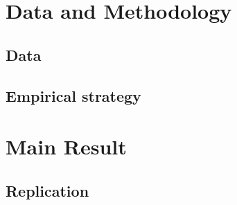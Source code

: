 \documentclass[12pt,a4paper]{article}
\newif\ifshowinstr
\newcommand{\instr}[1]{\ifshowinstr{\leavevmode\color{gray}\itshape\small [#1]\par}\fi}
\begin{document}
\section{Data and Methodology}

\subsection{Data}

\instr{Worksheet~A.2 should help you understand which data you need and which adjustments you will have to make for the replication.}


\subsection{Empirical strategy}

\instr{Think about what you need to explain the identification strategy of the authors and why they believe that it is valid. Appendix~B.1 summarizes the main points for OLS, panel data and IV designs. You can use these as a reference.}

%

\section{Main Result}

\subsection{Replication}

\instr{This part should include your main replication table (Table~\ref{tab:main}) and figure(s) (at least Figure~\ref{fig:main}). Replicate at least what you consider the main column of the main results table, as well as one or two figures that visualize the result. Do your results differ? Worksheet~A.3 helps you think about why they might differ. It is fine if you cannot replicate a number exactly, as long as you understand why.}
\end{document}
